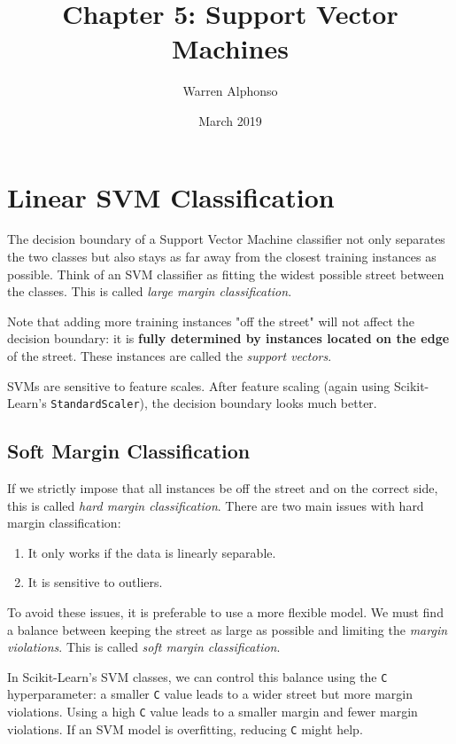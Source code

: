 \documentclass[letterpaper]{article}
\title{Chapter 5: Support Vector Machines}
\author{Warren Alphonso}
\date{March 2019}
\begin{document}
\maketitle

\section{Linear SVM Classification}
The decision boundary of a Support Vector Machine classifier not only separates the two classes but also stays as far away from the closest training instances as possible. Think of an SVM classifier as fitting the widest possible street between the classes. This is called \textsl{large margin classification}. 

Note that adding more training instances "off the street" will not affect the decision boundary: it is \textbf{fully determined by instances located on the edge} of the street. These instances are called the \textsl{support vectors}. 

SVMs are sensitive to feature scales. After feature scaling (again using Scikit-Learn's \texttt{StandardScaler}), the decision boundary looks much better. 

\subsection{Soft Margin Classification}
If we strictly impose that all instances be off the street and on the correct side, this is called \textsl{hard margin classification}. There are two main issues with hard margin classification: 

\begin{enumerate}
	\item It only works if the data is linearly separable. 
	\item It is sensitive to outliers. 
\end{enumerate}

To avoid these issues, it is preferable to use a more flexible model. We must find a balance between keeping the street as large as possible and limiting the \textsl{margin violations}. This is called \textsl{soft margin classification}. 

In Scikit-Learn's SVM classes, we can control this balance using the \texttt{C} hyperparameter: a smaller \texttt{C} value leads to a wider street but more margin violations. Using a high \texttt{C} value leads to a smaller margin and fewer margin violations. If an SVM model is overfitting, reducing \texttt{C} might help. 
\end{document}

